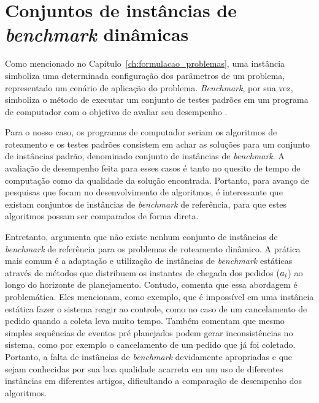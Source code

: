 \chapter{Conjuntos de instâncias de \textit{benchmark} dinâmicas}
\label{ch:instancias}
Como mencionado no Capítulo~\ref{ch:formulacao_problemas}, uma instância
simboliza uma determinada configuração dos parâmetros de um problema,
representado um cenário de aplicação do problema.
\textit{Benchmark}, por sua vez, simboliza o método de executar um conjunto de
testes padrões em um programa de computador com o objetivo de avaliar seu
desempenho \cite{fleming_how_1986}.

Para o nosso caso, os programas de computador seriam os algoritmos de
roteamento e os testes padrões consistem em achar as soluções para um conjunto 
de instâncias padrão, denominado conjunto de instâncias de \textit{benchmark}.
A avaliação de desempenho feita para esses casos é tanto no quesito de tempo
de computação como da qualidade da solução encontrada.
Portanto, para avanço de pesquisas que focam no desenvolvimento de algoritmos,
é interessante que existam conjuntos de instâncias de
\textit{benchmark} de referência, para que estes algoritmos possam ser
comparados de forma direta.

Entretanto, \textcite{pillac_review_2013} argumenta que não existe nenhum
conjunto de instâncias de \textit{benchmark} de referência para os problemas 
de roteamento dinâmico.
A prática mais comum é a adaptação e utilização de instâncias de 
\textit{benchmark} estáticas através de métodos que distribuem os instantes de 
chegada dos pedidos ($a_i$) ao longo do horizonte de
planejamento.
Contudo, \textcite{maciejewski_towards_2017} comenta que essa abordagem é 
problemática.
Eles mencionam, como exemplo, que é impossível em uma instância estática fazer 
o sistema reagir ao controle, como no caso de um cancelamento de pedido quando 
a coleta leva muito tempo. 
Também comentam que mesmo simples sequências de eventos pré planejados podem
gerar inconsistências no sistema, como por exemplo o cancelamento de um pedido
que já foi coletado.
Portanto, a falta de instâncias de \textit{benchmark} devidamente apropriadas e
que sejam conhecidas por sua boa qualidade acarreta em um uso de diferentes 
instâncias em diferentes artigos, dificultando a comparação de desempenho dos 
algoritmos.

